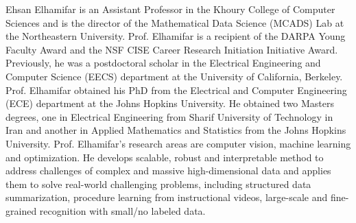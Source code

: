 \documentclass[10pt,journal,compsoc]{IEEEtran}
\newcommand{\1}{\boldsymbol{1}}
\newcommand{\0}{\boldsymbol{0}}
\newcommand{\<}{\langle}
\renewcommand{\>}{\rangle}
\begin{document}
\begin{IEEEbiography}{Ehsan Elhamifar} is an Assistant Professor in the Khoury College of Computer Sciences and is the director of the Mathematical Data Science (MCADS) Lab at the Northeastern University. Prof. Elhamifar is a recipient of the DARPA Young Faculty Award and the NSF CISE Career Research Initiation Initiative Award. Previously, he was a postdoctoral scholar in the Electrical Engineering and Computer Science (EECS) department at the University of California, Berkeley. Prof. Elhamifar obtained his PhD from the Electrical and Computer Engineering (ECE) department at the Johns Hopkins University. He obtained two Masters degrees, one in Electrical Engineering from Sharif University of Technology in Iran and another in Applied Mathematics and Statistics from the Johns Hopkins University. Prof. Elhamifar’s research areas are computer vision, machine learning and optimization. He develops scalable, robust and interpretable method to address challenges of complex and massive high-dimensional data and applies them to solve real-world challenging problems, including structured data summarization, procedure learning from instructional videos, large-scale and fine-grained recognition with small/no labeled data.
\end{IEEEbiography}
\end{document}
